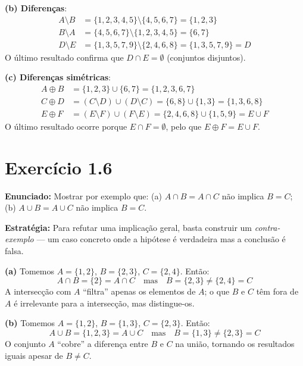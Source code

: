 \documentclass[12pt,a4paper]{article}
\begin{document}
\textbf{(b) Diferenças}:
\begin{align*}
A \setminus B &= \{1,2,3,4,5\} \setminus \{4,5,6,7\} = \{1,2,3\} \\
B \setminus A &= \{4,5,6,7\} \setminus \{1,2,3,4,5\} = \{6,7\} \\
D \setminus E &= \{1,3,5,7,9\} \setminus \{2,4,6,8\} = \{1,3,5,7,9\} = D
\end{align*}
O último resultado confirma que $D \cap E = \emptyset$ (conjuntos disjuntos).

\textbf{(c) Diferenças simétricas}:
\begin{align*}
A \oplus B &= \{1,2,3\} \cup \{6,7\} = \{1,2,3,6,7\} \\
C \oplus D &= (C \setminus D) \cup (D \setminus C) = \{6,8\} \cup \{1,3\} = \{1,3,6,8\} \\
E \oplus F &= (E \setminus F) \cup (F \setminus E) = \{2,4,6,8\} \cup \{1,5,9\} = E \cup F
\end{align*}
O último resultado ocorre porque $E \cap F = \emptyset$, pelo que $E \oplus F = E \cup F$.

\section*{Exercício 1.6}

\textbf{Enunciado:} Mostrar por exemplo que: (a) $A \cap B = A \cap C$ não implica $B = C$; (b) $A \cup B = A \cup C$ não implica $B = C$.

\begin{teoribox}
\textbf{Estratégia:} Para refutar uma implicação geral, basta construir um \emph{contra-exemplo} --- um caso concreto onde a hipótese é verdadeira mas a conclusão é falsa.
\end{teoribox}

\textbf{(a)} Tomemos $A = \{1,2\}$, $B = \{2,3\}$, $C = \{2,4\}$. Então:
\[
A \cap B = \{2\} = A \cap C \quad \text{mas} \quad B = \{2,3\} \neq \{2,4\} = C
\]
A intersecção com $A$ ``filtra'' apenas os elementos de $A$; o que $B$ e $C$ têm fora de $A$ é irrelevante para a intersecção, mas distingue-os.

\textbf{(b)} Tomemos $A = \{1,2\}$, $B = \{1,3\}$, $C = \{2,3\}$. Então:
\[
A \cup B = \{1,2,3\} = A \cup C \quad \text{mas} \quad B = \{1,3\} \neq \{2,3\} = C
\]
O conjunto $A$ ``cobre'' a diferença entre $B$ e $C$ na união, tornando os resultados iguais apesar de $B \neq C$.
\end{document}
